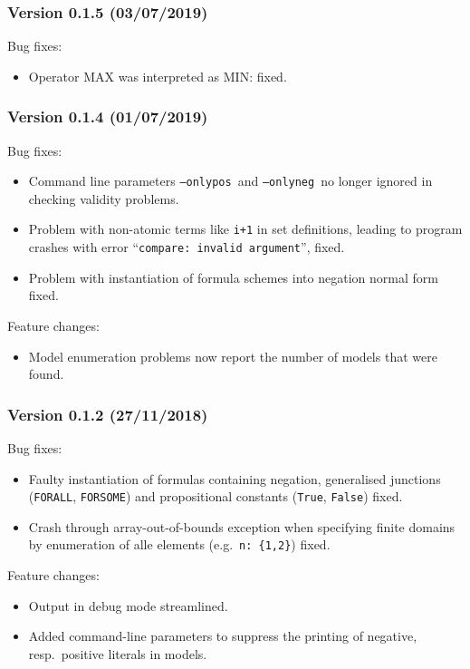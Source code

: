 \documentclass[twoside]{article}
\begin{document}
\subsubsection*{Version 0.1.5 (03/07/2019)}

Bug fixes:
\begin{itemize}
\item Operator MAX was interpreted as MIN: fixed.
\end{itemize}


\subsubsection*{Version 0.1.4 (01/07/2019)}

Bug fixes:
\begin{itemize}
\item Command line parameters \texttt{--onlypos} and \texttt{--onlyneg} no longer ignored in checking validity problems.
\item Problem with non-atomic terms like \texttt{i+1} in set definitions, leading to program crashes with error ``\texttt{compare: invalid argument}'', fixed.
\item Problem with instantiation of formula schemes into negation normal form fixed.
\end{itemize}
Feature changes:
\begin{itemize}
\item Model enumeration problems now report the number of models that were found.
\end{itemize}

\subsubsection*{Version 0.1.2 (27/11/2018)}
Bug fixes:
\begin{itemize}
\item Faulty instantiation of formulas containing negation, generalised junctions (\texttt{FORALL}, \texttt{FORSOME}) and propositional constants (\texttt{True}, \texttt{False}) fixed.
\item Crash through array-out-of-bounds exception when specifying finite domains by enumeration of alle elements (e.g.\ \texttt{n:~\{1,2\}}) fixed.
\end{itemize}
Feature changes:
\begin{itemize}
\item Output in debug mode streamlined.
\item Added command-line parameters to suppress the printing of negative, resp.\ positive literals in models.
\end{itemize}
\end{document}
